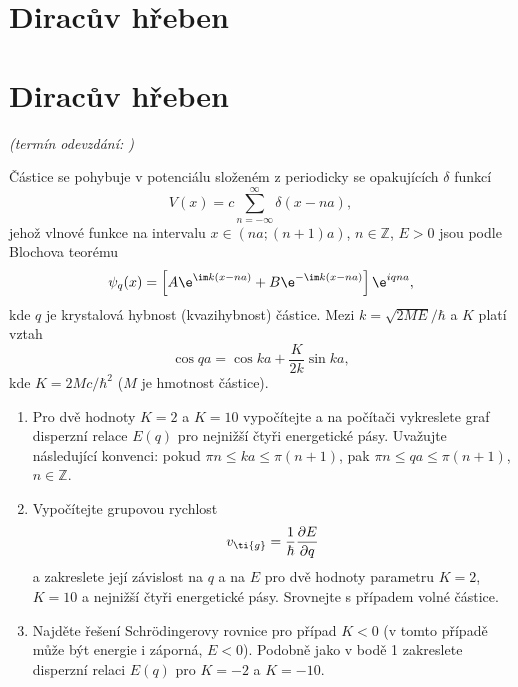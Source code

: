\documentclass[a4paper,11pt,twoside]{book}
\def\np{\newpage}
\newcommand{\exercise}[2][]{\ifthenelse{\isempty{#1}}
	{\np\section{#2}}
	{\np\section{#2}\small{\it{(termín odevzdání: {#1})}\newline}}
}
\begin{document}
\exercise{Diracův hřeben}
    Částice se pohybuje v potenciálu složeném z periodicky se opakujících $\delta$ funkcí
    \begin{equation*}
        V(x)=c\sum_{n=-\infty}^{\infty}\delta(x-na),
    \end{equation*}
    jehož vlnové funkce na intervalu 
    $x\in\left(na; \left(n+1\right)a\right)$, $n\in\mathbb{Z}$, $E>0$ 
    jsou podle Blochova teorému
    \begin{equation*}
        \psi_{q}(x)
            =\left[A\e^{\im k\left(x-na\right)}+B\e^{-\im k\left(x-na\right)}\right]\e^{iqna},
    \end{equation*}
    kde $q$ je krystalová hybnost (kvazihybnost) částice.
    Mezi $k=\sqrt{2ME}/\hbar$ a $K$ platí vztah
    \begin{equation*}
        \cos{qa}=\cos{ka}+\frac{K}{2k}\sin{ka},
    \end{equation*}
    kde $K=2Mc/\hbar^{2}$ ($M$ je hmotnost částice).
    \begin{enumerate}
    \item 
        Pro dvě hodnoty $K=2$ a $K=10$ vypočítejte a na počítači vykreslete graf disperzní relace $E(q)$ pro nejnižší čtyři energetické pásy.
        Uvažujte následující konvenci: pokud $\pi n\leq ka\leq\pi(n+1)$, pak $\pi n\leq qa\leq\pi(n+1)$, $n\in\mathbb{Z}$.
    \item 
        Vypočítejte grupovou rychlost
        \begin{equation*}
            v_{\ti{g}}=\frac{1}{\hbar}\frac{\partial E}{\partial q}
        \end{equation*}
        a zakreslete její závislost na $q$ a na $E$ pro dvě hodnoty parametru $K=2$, $K=10$ a nejnižší čtyři energetické pásy.
        Srovnejte s případem volné částice.
    \item
        Najděte řešení Schrödingerovy rovnice pro případ $K<0$ (v tomto případě může být energie i záporná, $E<0$).
        Podobně jako v bodě 1 zakreslete disperzní relaci $E(q)$ pro $K=-2$ a $K=-10$.

    \end{enumerate}
\end{document}
